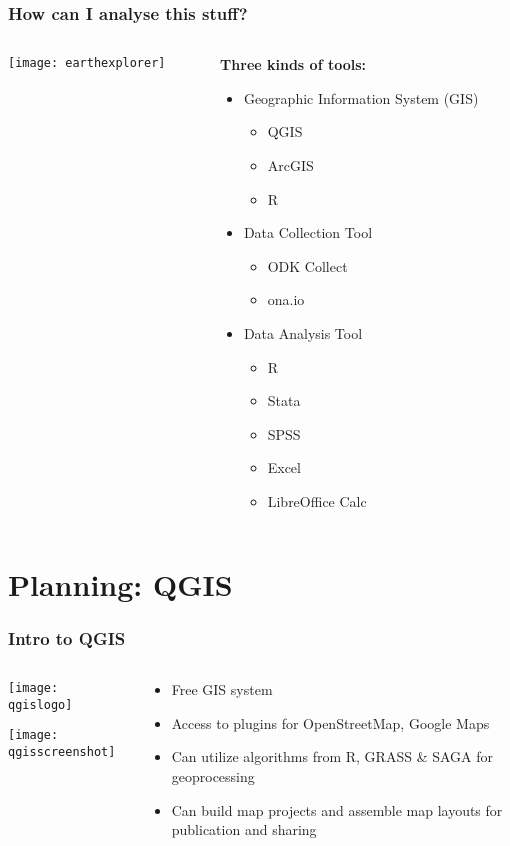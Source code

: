 \documentclass{beamer}
\begin{document}
\begin{frame}
\frametitle{How can I analyse this stuff?}
\begin{columns}
 \begin{column}[T]{0.6\textwidth}
  \texttt{[image: earthexplorer]}
 \end{column}
 \begin{column}[T]{0.4\textwidth}
  \textbf{Three kinds of tools:}
	\begin{itemize}
	 \item Geographic Information System (GIS)
	   \begin{itemize}
		\item QGIS
		\item ArcGIS
		\item R
	   \end{itemize}
	 \item Data Collection Tool
	  \begin{itemize}
		\item ODK Collect
		\item ona.io
	  \end{itemize}
	 \item Data Analysis Tool
	  \begin{itemize}
		\item R
		\item Stata
		\item SPSS
		\item Excel
		\item LibreOffice Calc
	  \end{itemize}
	\end{itemize}
 \end{column}
\end{columns}
	
\end{frame}

\section{Planning: QGIS}

\begin{frame}
\frametitle{Intro to QGIS}
	\begin{columns}
	 \begin{column}[T]{.6\textwidth}
		\texttt{[image: qgislogo]}
		
		\texttt{[image: qgisscreenshot]}
	 \end{column}
	 \begin{column}[T]{.4\textwidth}
		\begin{itemize}
		\item Free GIS system
		\item Access to plugins for OpenStreetMap, Google Maps
		\item Can utilize algorithms from R, GRASS & SAGA for geoprocessing
		\item Can build map projects and assemble map layouts for publication and sharing
		\end{itemize}
	 \end{column}	
	\end{columns}
\end{frame}
\end{document}
